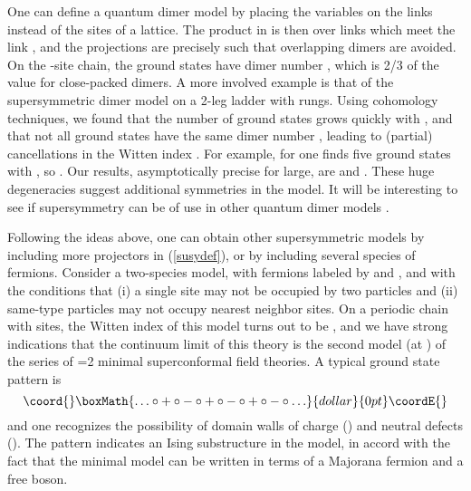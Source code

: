 \documentclass[a4paper,prl,aps,twocolumn]{revtex4}
\begin{document}
  
One can define a quantum dimer model by placing the variables
\coordHE{} on the links instead of the sites of a lattice.
The product in \coordHE{} is then over links which
meet the link \coordHE{}, and the projections are precisely
such that overlapping dimers are avoided. On the \coordHE{}-site chain, the
ground states have dimer number \coordHE{}, which is 2/3 of the
value for close-packed dimers. A more involved example is that of the
supersymmetric dimer model on a 2-leg ladder with \coordHE{} rungs. Using
cohomology techniques, we found that the number \coordHE{} of
ground states grows quickly with \coordHE{}, and that not all
ground states have the same dimer number \coordHE{}, leading to (partial)
cancellations in the Witten index \coordHE{}.  For example, for \coordHE{} one
finds five \coordHE{} ground states with \coordHE{}, so \coordHE{}. Our results, 
asymptotically precise for \coordHE{} large, are \coordHE{} and 
\coordHE{}. These huge degeneracies suggest additional 
symmetries in the model. It will be interesting to see if supersymmetry 
can be of use in other quantum dimer models \cite{MSF}.
  
Following the ideas above, one can obtain other supersymmetric models
by including more projectors in (\ref{susydef}), or by including
several species of fermions. Consider a
two-species model, with fermions labeled by \myHighlight{$+$}\coordHE{} and \myHighlight{$-$}\coordHE{}, and with the
conditions that (i) a single site may not be occupied by two particles
and (ii) same-type particles may not occupy nearest neighbor sites. On
a periodic chain with \coordHE{} sites, the Witten index of this model
turns out to be \coordHE{}, and we have strong indications that the
continuum limit of this theory is the second model (at \coordHE{}) of the
series of \coordHE{}=2 minimal superconformal field theories. A
typical ground state pattern is
$$\coord{}\boxMath{ \ldots 
\circ + \circ - \circ + \circ - \circ + \circ - \circ 
\ldots }{dollar}{0pt}\coordE{}$$  
and one recognizes the possibility of domain walls of charge \coordHE{} 
(\myHighlight{$\circ+-\ \circ$}\coordHE{}) and neutral defects (\myHighlight{$+\circ+$}\coordHE{}). The \myHighlight{$+/-$}\coordHE{} pattern 
indicates an Ising substructure in the model, in accord with the fact 
that the \coordHE{}  \coordHE{} minimal model can be written in terms of 
a Majorana fermion and a free boson.   
\end{document}
